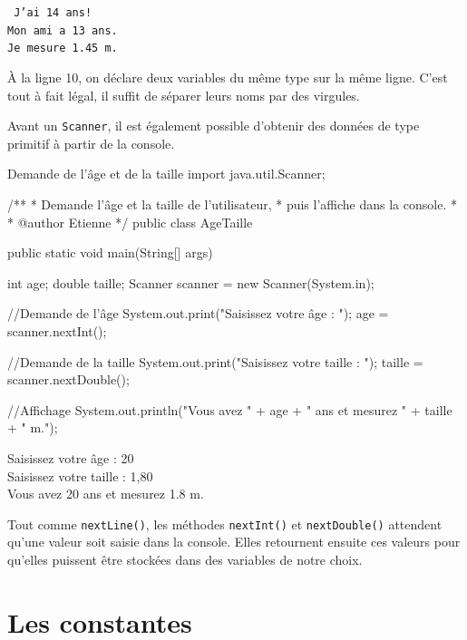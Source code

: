 \documentclass[12pt]{report}
\newenvironment{console}
	{
	\tcolorbox[title={Sortie console}, sharp corners = south, boxsep = 1.5mm]{} \tt
	}{\endtcolorbox}
\begin{document}
\begin{tcolorbox}[title={Sortie console}, sharp corners = south, boxsep = 1.5mm] \tt
	J'ai 14 ans!\\
	Mon ami a 13 ans.\\
	Je mesure 1.45 m.
\end{tcolorbox}

À la ligne 10, on déclare deux variables du même type sur la même ligne. C'est tout à fait légal, il suffit de séparer leurs noms par des virgules.

Avant un \texttt{Scanner}, il est également possible d'obtenir des données de type primitif à partir de la console.

\begin{MyTCB}{Demande de l'âge et de la taille}
import java.util.Scanner;

/**
 * Demande l'âge et la taille de l'utilisateur,
 * puis l'affiche dans la console.
 * 
 * @author Etienne
 */
public class AgeTaille {

	public static void main(String[] args) {
		
		int age;
		double taille;
		Scanner scanner = new Scanner(System.in);
		
		//Demande de l'âge
		System.out.print("Saisissez votre âge : ");
		age = scanner.nextInt();
		
		//Demande de la taille
		System.out.print("Saisissez votre taille : ");
		taille = scanner.nextDouble();
		
		//Affichage
		System.out.println("Vous avez " + age + " ans et mesurez " + taille + " m.");

	}

}
\end{MyTCB}
\begin{console}
	Saisissez votre âge : {\color{blue} 20}\\
	Saisissez votre taille : {\color{blue} 1,80} \\
	Vous avez 20 ans et mesurez 1.8 m.
\end{console}

Tout comme \texttt{nextLine()}, les méthodes \texttt{nextInt()} et \texttt{nextDouble()} attendent qu'une valeur soit saisie dans la console. Elles retournent ensuite ces valeurs pour qu'elles puissent être stockées dans des variables de notre choix.


\section{Les constantes}
\end{document}
